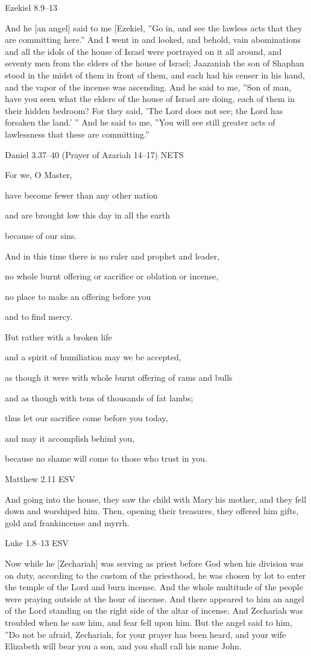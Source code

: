 \documentclass[
]{article}
\newcommand{\RL}[1]{\beginR #1\endR}
\begin{document}
Ezekiel 8.9--13

And he {[}an angel{]} said to me {[}Ezekiel, \RL{''}Go in, and see the
lawless acts that they are committing here.'' And I went in and looked,
and behold, vain abominations and all the idols of the house of Israel
were portrayed on it all around, and seventy men from the elders of the
house of Israel; Jaazaniah the son of Shaphan stood in the midst of them
in front of them, and each had his censer in his hand, and the vapor of
the incense was ascending. And he said to me, \RL{''}Son of man, have
you seen what the elders of the house of Israel are doing, each of them
in their hidden bedroom? For they said, \RL{'}The Lord does not see; the
Lord has forsaken the land.\RL{' ''} And he said to me, \RL{''}You will
see still greater acts of lawlessness that these are committing.''

Daniel 3.37--40 (Prayer of Azariah 14--17) NETS

For we, O Master,

have become fewer than any other nation

and are brought low this day in all the earth

because of our sins.

And in this time there is no ruler and prophet and leader,

no whole burnt offering or sacrifice or oblation or incense,

no place to make an offering before you

and to find mercy.

But rather with a broken life

and a spirit of humiliation may we be accepted,

as though it were with whole burnt offering of rams and bulls

and as though with tens of thousands of fat lambs;

thus let our sacrifice come before you today,

and may it accomplish behind you,

because no shame will come to those who trust in you.

Matthew 2.11 ESV

And going into the house, they saw the child with Mary his mother, and
they fell down and worshiped him. Then, opening their treasures, they
offered him gifts, gold and frankincense and myrrh.

Luke 1.8--13 ESV

Now while he {[}Zechariah{]} was serving as priest before God when his
division was on duty, according to the custom of the priesthood, he was
chosen by lot to enter the temple of the Lord and burn incense. And the
whole multitude of the people were praying outside at the hour of
incense. And there appeared to him an angel of the Lord standing on the
right side of the altar of incense. And Zechariah was troubled when he
saw him, and fear fell upon him. But the angel said to him, \RL{''}Do
not be afraid, Zechariah, for your prayer has been heard, and your wife
Elizabeth will bear you a son, and you shall call his name John.
\end{document}
